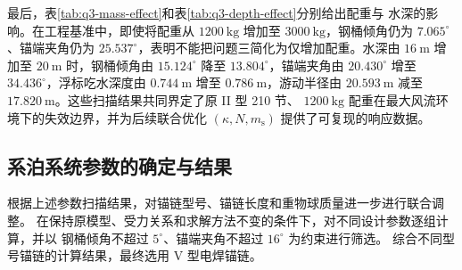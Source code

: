 \begin{table}[H]
  \centering
  \caption{不同风速对系统参数的影响（\(v_{\mathrm c}=1.5~\mathrm{m/s}\)，II 型 210 节，\(m_{\mathrm s}=1200~\mathrm{kg}\)）}
  \label{tab:q3-wind-effect}
  \small
  
\end{table}

\begin{table}[H]
  \centering
  \caption{不同水流速度对系统参数的影响（\(v_{\mathrm w}=36~\mathrm{m/s}\)，II 型 210 节，\(m_{\mathrm s}=1200~\mathrm{kg}\)）}
  \label{tab:q3-current-effect}
  \small
  
\end{table}

最后，表\ref{tab:q3-mass-effect}和表\ref{tab:q3-depth-effect}分别给出配重与
水深的影响。在工程基准中，即使将配重从 \(1200~\mathrm{kg}\) 增加至
\(3000~\mathrm{kg}\)，钢桶倾角仍为 \(7.065^\circ\)、锚端夹角仍为
\(25.537^\circ\)，表明不能把问题三简化为仅增加配重。水深由
\(16~\mathrm m\) 增加至 \(20~\mathrm m\) 时，钢桶倾角由
\(15.124^\circ\) 降至 \(13.804^\circ\)，锚端夹角由 \(20.430^\circ\)
增至 \(34.436^\circ\)，浮标吃水深度由 \(0.744~\mathrm m\) 增至
\(0.786~\mathrm m\)，游动半径由 \(20.593~\mathrm m\) 减至
\(17.820~\mathrm m\)。这些扫描结果共同界定了原 II 型 210 节、
\(1200~\mathrm{kg}\) 配重在最大风流环境下的失效边界，并为后续联合优化
\((\kappa,N,m_{\mathrm s})\) 提供了可复现的响应数据。

\begin{table}[H]
  \centering
  \caption{重物球质量对系统参数的影响（工程基准，II 型 210 节）}
  \label{tab:q3-mass-effect}
  \small
  
\end{table}

\begin{table}[H]
  \centering
  \caption{海水深度对系统参数的影响（\(v_{\mathrm w}=36~\mathrm{m/s}\)，\(v_{\mathrm c}=1.5~\mathrm{m/s}\)，II 型 210 节，\(m_{\mathrm s}=1200~\mathrm{kg}\)）}
  \label{tab:q3-depth-effect}
  \small
  
\end{table}

\subsection{系泊系统参数的确定与结果}

根据上述参数扫描结果，对锚链型号、锚链长度和重物球质量进一步进行联合调整。
在保持原模型、受力关系和求解方法不变的条件下，对不同设计参数逐组计算，并以
钢桶倾角不超过 \(5^\circ\)、锚端夹角不超过 \(16^\circ\) 为约束进行筛选。
综合不同型号锚链的计算结果，最终选用 V 型电焊锚链。

